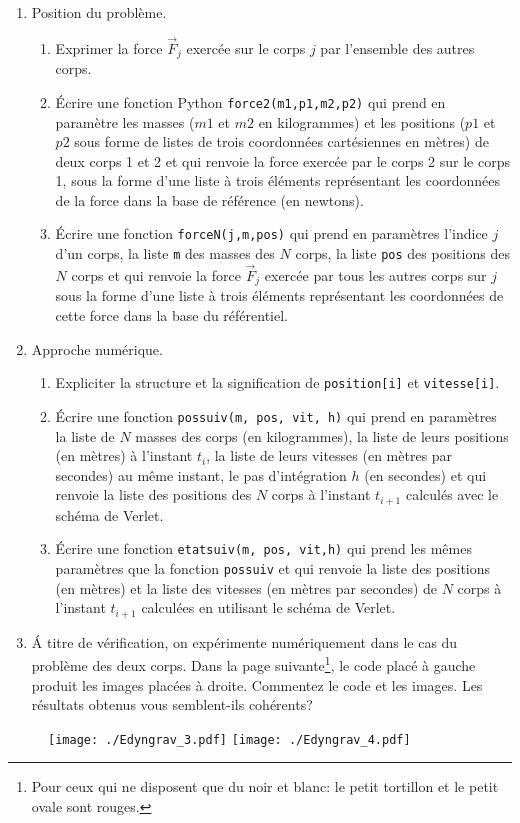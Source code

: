 \begin{enumerate}
  \item Position du problème.
\begin{enumerate}
  \item Exprimer la force $\overrightarrow{F}_j$ exercée sur le corps $j$ par l'ensemble des autres corps.
  \item \'Ecrire une fonction Python \texttt{force2(m1,p1,m2,p2)} qui prend en paramètre les masses ($m1$ et $m2$ en kilogrammes) et les positions ($p1$ et $p2$ sous forme de listes de trois coordonnées cartésiennes en mètres) de deux corps 1 et 2 et qui renvoie la force exercée par le corps 2 sur le corps 1, sous la forme d'une liste à trois éléments représentant les coordonnées de la force dans la base de référence (en newtons).
  \item \'Ecrire une fonction \texttt{forceN(j,m,pos)} qui prend en paramètres l'indice $j$ d'un corps, la liste \texttt{m} des masses des $N$ corps, la liste \texttt{pos} des positions des $N$ corps et qui renvoie la force $\overrightarrow{F}_j$ exercée par tous les autres corps sur $j$ sous la forme d'une liste à trois éléments représentant les coordonnées de cette force dans la base du référentiel.
\end{enumerate}

\item Approche numérique.
\begin{enumerate}
  \item Expliciter la structure et la signification de \texttt{position[i]} et \texttt{vitesse[i]}.
  \item \'Ecrire une fonction \texttt{pos\textunderscore suiv(m, pos, vit, h)} qui prend en paramètres la liste de $N$ masses des corps (en kilogrammes), la liste de leurs positions (en mètres) à l'instant $t_i$, la liste de leurs vitesses (en mètres par secondes) au même instant, le pas d'intégration $h$ (en secondes) et qui renvoie la liste des positions des $N$ corps à l'instant $t_{i+1}$ calculés avec le schéma de Verlet.
  \item \'Ecrire une fonction \texttt{etat\textunderscore suiv(m, pos, vit,h)} qui prend les mêmes paramètres que la fonction \texttt{pos\textunderscore suiv} et qui renvoie la liste des positions (en mètres) et la liste des vitesses (en mètres par secondes) de $N$ corps à l'instant $t_{i+1}$ calculées en utilisant le schéma de Verlet. 
\end{enumerate}
  \item \'A titre de vérification, on expérimente numériquement dans le cas du problème des deux corps. Dans la page suivante\footnote{Pour ceux qui ne disposent que du noir et blanc: le petit tortillon et le petit ovale sont rouges.}, le code placé à gauche produit les images placées à droite. Commentez le code et les images. Les résultats obtenus vous semblent-ils cohérents?
\end{enumerate}
\newpage

\begin{figure}[h]
  \centering
  \texttt{[image: ./Edyngrav\_3.pdf]}
  \texttt{[image: ./Edyngrav\_4.pdf]}
\end{figure}




